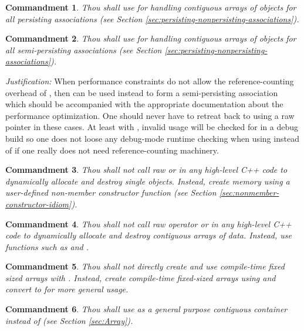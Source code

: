 \documentclass[pdf,ps2pdf,11pt]{SANDreport}
\newtheorem{commandment}{Commandment}
\begin{document}
\begin{commandment}
Thou shall use {} for handling contiguous arrays of
objects for all persisting associations (see Section
{}\ref{sec:persisting-nonpersisting-associations}).
\end{commandment}

\begin{commandment}\label{cmnd:arrayview-semi-persisting}
Thou shall use {} for handling contiguous arrays of
objects for all semi-persisting associations (see Section
{}\ref{sec:persisting-nonpersisting-associations}).
\end{commandment}
{}\textit{Justification:} When performance constraints do not allow
the reference-counting overhead of {}, then
{} can be used instead to form a semi-persisting
association which should be accompanied with the appropriate
documentation about the performance optimization.  One should never
have to retreat back to using a raw pointer in these cases.  At least
with {}, invalid usage will be checked for in a debug
build so one does not loose any debug-mode runtime checking when using
{} instead of {} if one really does not
need reference-counting machinery.

\begin{commandment}
Thou shall not call raw {} or {} in any
high-level C++ code to dynamically allocate and destroy single
objects.  Instead, create memory using a user-defined non-member
constructor function (see Section
{}\ref{sec:nonmember-constructor-idiom}).
\end{commandment}

\begin{commandment}
Thou shall not call raw operator {} or {} in any high-level C++ code to dynamically allocate and destroy
contiguous arrays of data.  Instead, use functions such as
{} and {}.
\end{commandment}

\begin{commandment}
Thou shall not directly create and use compile-time fixed sized arrays
with {}.  Instead, create compile-time fixed-sized arrays
using {} and convert to
{} for more general usage.
\end{commandment}

\begin{commandment}
Thou shall use {} as a general purpose
contiguous container instead of {} (see Section
{}\ref{sec:Array}).
\end{commandment}
\end{document}
